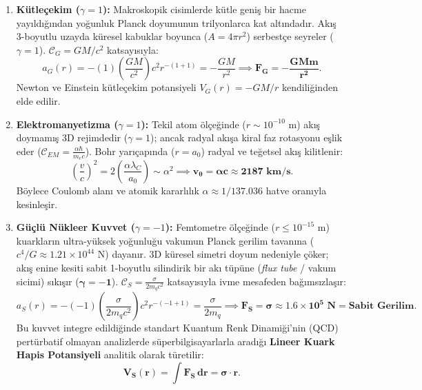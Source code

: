 \begin{enumerate}
    \item \textbf{Kütleçekim ($\gamma = 1$):} Makroskopik cisimlerde kütle geniş bir hacme yayıldığından yoğunluk Planck doyumunun trilyonlarca kat altındadır. Akış 3-boyutlu uzayda küresel kabuklar boyunca ($A = 4\pi r^2$) serbestçe seyreler ($\gamma = 1$). $\mathcal{C}_G = GM/c^2$ katsayısıyla:
          \begin{equation}
              a_G(r) = -(1) \left(\frac{GM}{c^2}\right) c^2 r^{-(1+1)} = -\frac{GM}{r^2} \implies \mathbf{F_G = -\frac{G M m}{r^2}}.
          \end{equation}
          Newton ve Einstein kütleçekim potansiyeli $V_G(r) = -GM/r$ kendiliğinden elde edilir.

    \item \textbf{Elektromanyetizma ($\gamma = 1$):} Tekil atom ölçeğinde ($r \sim 10^{-10}\text{ m}$) akış doymamış 3D rejimdedir ($\gamma = 1$); ancak radyal akışa kiral faz rotasyonu eşlik eder ($\mathcal{C}_{EM} = \frac{\alpha \hbar}{m_e c}$). Bohr yarıçapında ($r = a_0$) radyal ve teğetsel akış kilitlenir:
          \begin{equation}
              \left(\frac{v}{c}\right)^2 = 2\left(\frac{\alpha \lambda_C}{a_0}\right) \sim \alpha^2 \implies \mathbf{v_\theta = \alpha c \approx 2187\text{ km/s}}.
          \end{equation}
          Böylece Coulomb alanı ve atomik kararlılık $\alpha \approx 1/137.036$ hatve oranıyla kesinleşir.

    \item \textbf{Güçlü Nükleer Kuvvet ($\gamma = -1$):} Femtometre ölçeğinde ($r \le 10^{-15}\text{ m}$) kuarkların ultra-yüksek yoğunluğu vakumun Planck gerilim tavanına ($c^4/G \approx 1.21 \times 10^{44}\text{ N}$) dayanır. 3D küresel simetri doyum nedeniyle çöker; akış enine kesiti sabit 1-boyutlu silindirik bir akı tüpüne (\textit{flux tube} / vakum sicimi) sıkışır ($\mathbf{\gamma = -1}$). $\mathcal{C}_S = \frac{\sigma}{2 m_q c^2}$ katsayısıyla ivme mesafeden bağımsızlaşır:
          \begin{equation}
              a_S(r) = -(-1) \left(\frac{\sigma}{2 m_q c^2}\right) c^2 r^{-(-1+1)} = \frac{\sigma}{2 m_q} \implies \mathbf{F_S = \sigma \approx 1.6 \times 10^5\text{ N} = \text{Sabit Gerilim}}.
          \end{equation}
          Bu kuvvet integre edildiğinde standart Kuantum Renk Dinamiği'nin (QCD) pertürbatif olmayan analizlerde süperbilgisayarlarla aradığı \textbf{Lineer Kuark Hapis Potansiyeli} analitik olarak türetilir:
          \begin{equation}
              \mathbf{V_S(r) = \int F_S \, dr = \sigma \cdot r}.
          \end{equation}


\end{enumerate}
